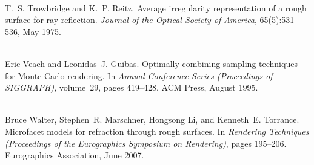 \begin{DoxyDescription}
\item[\label{citelist_CITEREF_Trowbridge:1975:Average}%
\Hypertarget{citelist_CITEREF_Trowbridge:1975:Average}%
\mbox{[}13\mbox{]}]\hfill \\
T.~S. Trowbridge and K.~P. Reitz. Average irregularity representation of a rough surface for ray reflection. {\itshape Journal of the Optical Society of America}, 65(5)\+:531--536, May 1975. 


\item[\label{citelist_CITEREF_Veach:1995:Optimally}%
\Hypertarget{citelist_CITEREF_Veach:1995:Optimally}%
\mbox{[}14\mbox{]}]\hfill \\
Eric Veach and Leonidas~J. Guibas. Optimally combining sampling techniques for Monte Carlo rendering. In {\itshape Annual Conference Series (Proceedings of SIGGRAPH)}, volume~29, pages 419--428. ACM Press, August 1995. 


\item[\label{citelist_CITEREF_Walter:2007:Microfacet}%
\Hypertarget{citelist_CITEREF_Walter:2007:Microfacet}%
\mbox{[}15\mbox{]}]\hfill \\
Bruce Walter, Stephen~R. Marschner, Hongsong Li, and Kenneth~E. Torrance. Microfacet models for refraction through rough surfaces. In {\itshape Rendering Techniques (Proceedings of the Eurographics Symposium on Rendering)}, pages 195--206. Eurographics Association, June 2007. 


\end{DoxyDescription}